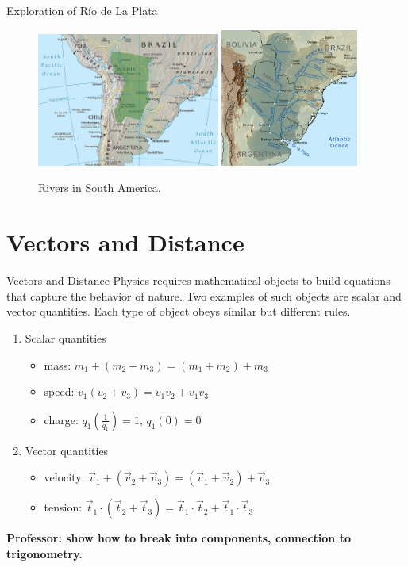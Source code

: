 \documentclass{beamer}
\begin{document}
\begin{frame}{Exploration of R\'{i}o de La Plata}
\begin{figure}
\centering
\includegraphics[width=6cm]{figures/granChaco.jpg}
\includegraphics[width=4.5cm]{figures/rivers.png}
\caption{Rivers in South America.}
\end{figure}
\end{frame}

\section{Vectors and Distance}

\begin{frame}{Vectors and Distance}
Physics requires \alert{mathematical objects} to build equations that capture the behavior of nature.  Two examples of such objects are \alert{scalar} and \alert{vector} quantities.  Each type of object obeys similar but different rules.
\begin{enumerate}
\item Scalar quantities
\begin{itemize}
\item mass: $m_1+(m_2+m_3) = (m_1+m_2)+m_3$
\item speed: $v_1(v_2+v_3) = v_1v_2+v_1v_3$
\item charge: $q_1 \left(\frac{1}{q_1}\right) = 1$, $q_1(0) = 0$
\end{itemize}
\item Vector quantities
\begin{itemize}
\item velocity: $\vec{v}_1 + (\vec{v}_2+\vec{v}_3) = (\vec{v}_1 + \vec{v}_2)+\vec{v}_3$
\item tension: $\vec{t}_1 \cdot (\vec{t}_2 + \vec{t}_3) = \vec{t}_1 \cdot \vec{t}_2 + \vec{t}_1 \cdot \vec{t}_3$
\end{itemize}
\end{enumerate}
\textbf{Professor: show how to break into components, connection to trigonometry.}
\end{frame}
\end{document}
